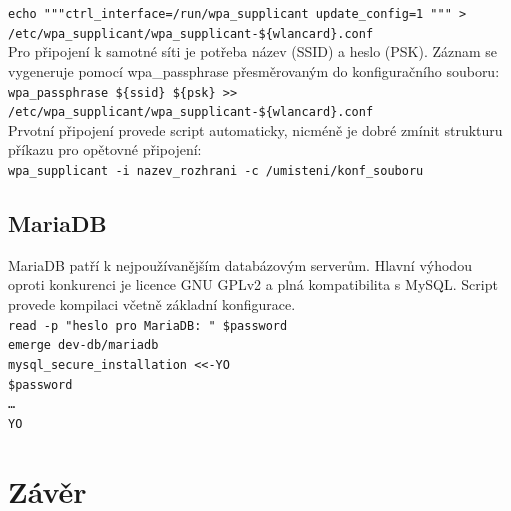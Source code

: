 \documentclass[12pt,a4paper,twoside,]{article}
\begin{document}
{{{{{{\texttt{echo """ctrl\_interface=/run/wpa\_supplicant
	update\_config=1 """ > \hspace*{1.5em}/etc/wpa\_supplicant/wpa\_supplicant-\$\{wlancard\}.conf}\\

\hspace{-1.5em}Pro připojení k samotné síti je potřeba název (SSID) a heslo (PSK). Záznam se vygeneruje pomocí wpa\_passphrase přesměrovaným do konfiguračního souboru: \\

\texttt{wpa\_passphrase \$\{ssid\} \$\{psk\} >> \\\hspace*{1.5em}/etc/wpa\_supplicant/wpa\_supplicant-\$\{wlancard\}.conf}\\

\hspace{-1.5em}Prvotní připojení provede script automaticky, nicméně je dobré zmínit strukturu příkazu pro opětovné připojení:\\

\texttt{wpa\_supplicant -i nazev\_rozhrani -c /umisteni/konf\_souboru}
\subsection{\textsf{MariaDB}}
MariaDB patří k nejpoužívanějším databázovým serverům. Hlavní výhodou oproti konkurenci je licence GNU GPLv2 a plná kompatibilita s MySQL. Script provede kompilaci včetně základní konfigurace.\\

\texttt{read -p "heslo pro MariaDB: " \$password}\\
\hspace*{1.5em}\texttt{emerge dev-db/mariadb}\\
\hspace*{1.5em}\texttt{mysql\_secure\_installation <<-YO}\\
\hspace*{3em}\texttt{\$password}\\
\hspace*{3em}\texttt{\dots}\\
\hspace*{1.5em}\texttt{YO}

\newpage
\section{\textsf{Závěr}}
\newpage
}}}}}}
\end{document}
